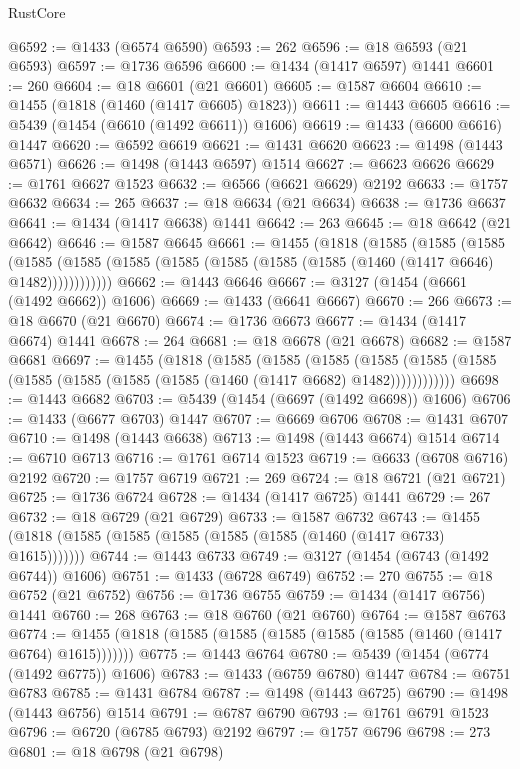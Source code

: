 \begin{lexlean}{RustCore}
\begin{coremodule}
@6592 := @1433 (@6574 @6590)
@6593 := 262
@6596 := @18 @6593 (@21 @6593)
@6597 := @1736 @6596
@6600 := @1434 (@1417 @6597) @1441
@6601 := 260
@6604 := @18 @6601 (@21 @6601)
@6605 := @1587 @6604
@6610 := @1455 (@1818 (@1460 (@1417 @6605) @1823))
@6611 := @1443 @6605
@6616 := @5439 (@1454 (@6610 (@1492 @6611)) @1606)
@6619 := @1433 (@6600 @6616) @1447
@6620 := @6592 @6619
@6621 := @1431 @6620
@6623 := @1498 (@1443 @6571)
@6626 := @1498 (@1443 @6597) @1514
@6627 := @6623 @6626
@6629 := @1761 @6627 @1523
@6632 := @6566 (@6621 @6629) @2192
@6633 := @1757 @6632
@6634 := 265
@6637 := @18 @6634 (@21 @6634)
@6638 := @1736 @6637
@6641 := @1434 (@1417 @6638) @1441
@6642 := 263
@6645 := @18 @6642 (@21 @6642)
@6646 := @1587 @6645
@6661 := @1455
    (@1818
      (@1585
        (@1585
          (@1585
            (@1585 (@1585 (@1585 (@1585 (@1585 (@1585 (@1585 (@1460 (@1417 @6646) @1482))))))))))))
@6662 := @1443 @6646
@6667 := @3127 (@1454 (@6661 (@1492 @6662)) @1606)
@6669 := @1433 (@6641 @6667)
@6670 := 266
@6673 := @18 @6670 (@21 @6670)
@6674 := @1736 @6673
@6677 := @1434 (@1417 @6674) @1441
@6678 := 264
@6681 := @18 @6678 (@21 @6678)
@6682 := @1587 @6681
@6697 := @1455
    (@1818
      (@1585
        (@1585
          (@1585
            (@1585 (@1585 (@1585 (@1585 (@1585 (@1585 (@1585 (@1460 (@1417 @6682) @1482))))))))))))
@6698 := @1443 @6682
@6703 := @5439 (@1454 (@6697 (@1492 @6698)) @1606)
@6706 := @1433 (@6677 @6703) @1447
@6707 := @6669 @6706
@6708 := @1431 @6707
@6710 := @1498 (@1443 @6638)
@6713 := @1498 (@1443 @6674) @1514
@6714 := @6710 @6713
@6716 := @1761 @6714 @1523
@6719 := @6633 (@6708 @6716) @2192
@6720 := @1757 @6719
@6721 := 269
@6724 := @18 @6721 (@21 @6721)
@6725 := @1736 @6724
@6728 := @1434 (@1417 @6725) @1441
@6729 := 267
@6732 := @18 @6729 (@21 @6729)
@6733 := @1587 @6732
@6743 := @1455 (@1818 (@1585 (@1585 (@1585 (@1585 (@1585 (@1460 (@1417 @6733) @1615)))))))
@6744 := @1443 @6733
@6749 := @3127 (@1454 (@6743 (@1492 @6744)) @1606)
@6751 := @1433 (@6728 @6749)
@6752 := 270
@6755 := @18 @6752 (@21 @6752)
@6756 := @1736 @6755
@6759 := @1434 (@1417 @6756) @1441
@6760 := 268
@6763 := @18 @6760 (@21 @6760)
@6764 := @1587 @6763
@6774 := @1455 (@1818 (@1585 (@1585 (@1585 (@1585 (@1585 (@1460 (@1417 @6764) @1615)))))))
@6775 := @1443 @6764
@6780 := @5439 (@1454 (@6774 (@1492 @6775)) @1606)
@6783 := @1433 (@6759 @6780) @1447
@6784 := @6751 @6783
@6785 := @1431 @6784
@6787 := @1498 (@1443 @6725)
@6790 := @1498 (@1443 @6756) @1514
@6791 := @6787 @6790
@6793 := @1761 @6791 @1523
@6796 := @6720 (@6785 @6793) @2192
@6797 := @1757 @6796
@6798 := 273
@6801 := @18 @6798 (@21 @6798)

\end{coremodule}
\end{lexlean}
